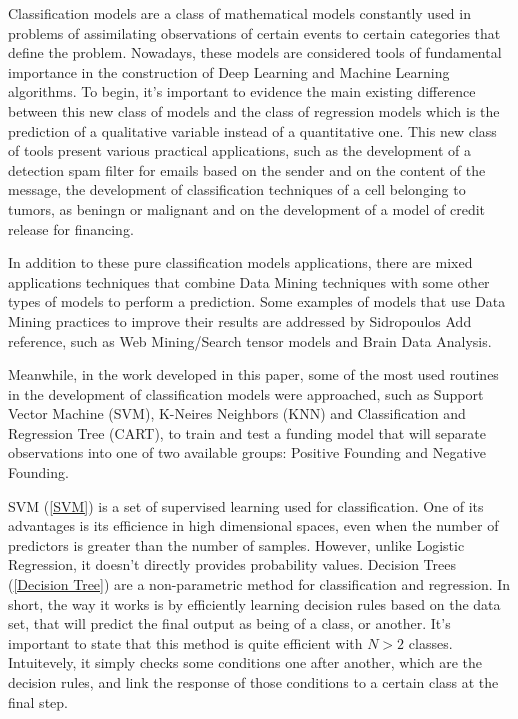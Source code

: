 \documentclass[conference]{IEEEtran}
\newcommand{\reviewNormal}[1]{{\color{yellow} #1}} %
\begin{document}
Classification models are a class of mathematical models constantly used in problems of
assimilating observations of certain events to certain categories that define the problem.
Nowadays, these models are considered tools of fundamental importance in the construction 
of Deep Learning and Machine Learning algorithms. To begin, it's important to evidence 
the main existing difference between this new class of models and the class of 
regression models which is the prediction of a qualitative variable instead of a quantitative
one. This new class of tools present various practical applications, such as the 
development of a detection spam filter for emails based on the sender and on the content
of the message, the development of classification techniques of a cell belonging to tumors, 
as beningn or malignant and on the development of a model of credit release for financing.

In addition to these pure classification models applications, there are mixed applications 
techniques that combine Data Mining techniques with some other types of models to perform
a prediction. Some examples of models that use Data Mining practices to improve their 
results are addressed by Sidropoulos \reviewNormal{Add reference}, such as Web Mining/Search 
tensor models and Brain Data Analysis. 

Meanwhile, in the work developed in this paper, some of the most used routines in the
development of classification models were approached, such as Support Vector Machine (SVM),
K-Neires Neighbors (KNN) and Classification and Regression Tree (CART), to train and 
test a funding model that will separate observations into one of two available groups:
Positive Founding and Negative Founding.

SVM (\ref{SVM}) is a set of supervised learning used for classification. One of its
advantages is its efficience in high dimensional spaces, even when the number of 
predictors is greater than the number of samples. However, unlike Logistic Regression,
it doesn't directly provides probability values. Decision Trees (\ref{Decision Tree})
are a non-parametric method for classification and regression. In short, the way it 
works is by efficiently learning decision rules based on the data set, that will
predict the final output as being of a class, or another. It's important to state 
that this method is quite efficient with $N>2$ classes. Intuitevely, it simply checks 
some conditions one after another, which are the decision rules, and link the response of those 
conditions to a certain class at the final step.  
\end{document}

